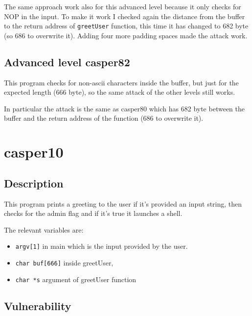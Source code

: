 \documentclass[a4paper,12pt]{article}
\begin{document}
The same approach work also for this advanced level because it only checks for NOP in the input. To make it work I checked again the distance from the buffer to the return address of \texttt{greetUser} function, this time it has changed to 682 byte (so 686 to overwrite it). Adding four more padding spaces made the attack work.



\subsection{Advanced level casper82}

This program checks for non-ascii characters inside the buffer, but just for the expected length (666 byte), so the same attack of the other levels still works.

In particular the attack is the same as casper80 which has 682 byte between the buffer and the return address of the function (686 to overwrite it).


\section{casper10}

\subsection{Description}
This program prints a greeting to the user if it's provided an input string, then checks for the admin flag and if it's true it launches a shell. 

The relevant variables are:
\begin{itemize}

\item \texttt{argv[1]} in main which is the input provided by the user.
\item \texttt{char buf[666]} inside greetUser,
\item \texttt{char *s} argument of greetUser function

\end{itemize}


\subsection{Vulnerability}
\end{document}

